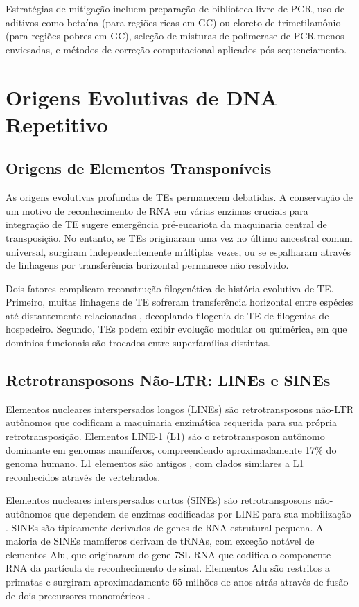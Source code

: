 Estratégias de mitigação incluem preparação de biblioteca livre de PCR, uso de aditivos como betaína (para regiões ricas em GC) ou cloreto de trimetilamônio (para regiões pobres em GC), seleção de misturas de polimerase de PCR menos enviesadas, e métodos de correção computacional aplicados pós-sequenciamento.

\section{Origens Evolutivas de DNA Repetitivo}

\subsection{Origens de Elementos Transponíveis}

As origens evolutivas profundas de TEs permanecem debatidas. A conservação de um motivo de reconhecimento de RNA em várias enzimas cruciais para integração de TE sugere emergência pré-eucariota da maquinaria central de transposição. No entanto, se TEs originaram uma vez no último ancestral comum universal, surgiram independentemente múltiplas vezes, ou se espalharam através de linhagens por transferência horizontal permanece não resolvido.

Dois fatores complicam reconstrução filogenética de história evolutiva de TE. Primeiro, muitas linhagens de TE sofreram transferência horizontal entre espécies até distantemente relacionadas \parencite{schaack2010}, decoplando filogenia de TE de filogenias de hospedeiro. Segundo, TEs podem exibir evolução modular ou quimérica, em que domínios funcionais são trocados entre superfamílias distintas.

\subsection{Retrotransposons Não-LTR: LINEs e SINEs}

Elementos nucleares interspersados longos (LINEs) são retrotransposons não-LTR autônomos que codificam a maquinaria enzimática requerida para sua própria retrotransposição. Elementos LINE-1 (L1) são o retrotransposon autônomo dominante em genomas mamíferos, compreendendo aproximadamente 17\% do genoma humano. L1 elementos são antigos \parencite{malik2001}, com clados similares a L1 reconhecidos através de vertebrados.

Elementos nucleares interspersados curtos (SINEs) são retrotransposons não-autônomos que dependem de enzimas codificadas por LINE para sua mobilização \parencite{dewannieux2003}. SINEs são tipicamente derivados de genes de RNA estrutural pequena. A maioria de SINEs mamíferos derivam de tRNAs, com exceção notável de elementos Alu, que originaram do gene 7SL RNA que codifica o componente RNA da partícula de reconhecimento de sinal. Elementos Alu são restritos a primatas e surgiram aproximadamente 65 milhões de anos atrás através de fusão de dois precursores monoméricos \parencite{batzer2002}.

